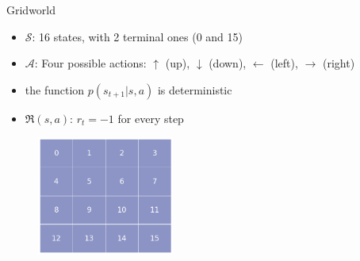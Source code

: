 \documentclass{beamer}
\begin{document}
\begin{frame}{Gridworld}

\begin{itemize}
    \item $\mathcal{S}$: 16 states, with 2 terminal ones (0 and 15)
    \item $\mathcal{A}$: Four possible actions: $\uparrow$ (up), $\downarrow$ (down), $\leftarrow$ (left), $\rightarrow$ (right)
    \item the function $p(s_{t+1}|s,a)$ is deterministic
\item $\Re(s,a)$: $r_t = -1$ for every step
\end{itemize}

\begin{figure}[t]
\includegraphics[width=4.5cm]{./images/GridWorld.png}
\centering
\end{figure}


\end{frame}
\end{document}
